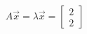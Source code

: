 \documentclass[preview]{standalone}
\begin{document}
\begin{align*}
A\vec{x} = \lambda \vec{x} = \begin{bmatrix} 2 \\ 2 \end{bmatrix}
\end{align*}
\end{document}

